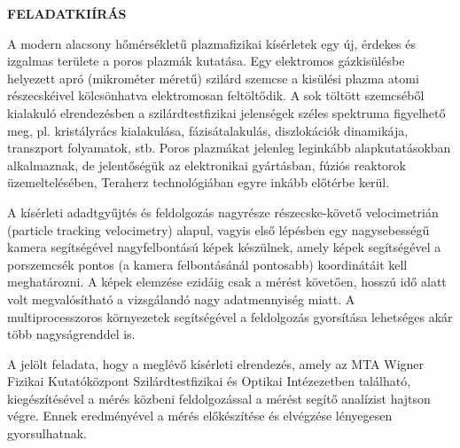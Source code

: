 \clearpage
\begin{center}
\large
\textbf{FELADATKIÍRÁS}\\
\end{center}

A modern alacsony hőmérsékletű plazmafizikai kísérletek egy új, érdekes és izgalmas területe a poros plazmák
kutatása. Egy elektromos gázkisülésbe helyezett apró (mikrométer méretű) szilárd szemcse a kisülési plazma
atomi részecskéivel kölcsönhatva elektromosan feltöltődik. A sok töltött szemcséből kialakuló elrendezésben a
szilárdtestfizikai jelenségek széles spektruma figyelhető meg, pl. kristályrács kialakulása, fázisátalakulás,
diszlokációk dinamikája, transzport folyamatok, stb. Poros plazmákat jelenleg leginkább alapkutatásokban
alkalmaznak, de jelentőségük az elektronikai gyártásban, fúziós reaktorok üzemeltelésében, Teraherz
technológiában egyre inkább előtérbe kerül.

A kísérleti adadtgyűjtés és feldolgozás nagyrésze részecske-követő velocimetrián (particle tracking velocimetry)
alapul, vagyis első lépésben egy nagysebességű kamera segítségével nagyfelbontású képek készülnek, amely
képek segítségével a porszemcsék pontos (a kamera felbontásánál pontosabb) koordinátáit kell meghatározni. A
képek elemzése ezidáig csak a mérést követően, hosszú idő alatt volt megvalósítható a vizsgálandó nagy
adatmennyiség miatt. A multiprocesszoros környezetek segítségével a feldolgozás gyorsítása lehetséges akár
több nagyságrenddel is.

A jelölt feladata, hogy a meglévő kísérleti elrendezés, amely az MTA Wigner Fizikai Kutatóközpont
Szilárdtestfizikai és Optikai Intézezetben található, kiegészítésével a mérés közbeni feldolgozással a mérést
segítő analízist hajtson végre. Ennek eredményével a mérés előkészítése és elvégzése lényegesen gyorsulhatnak.


